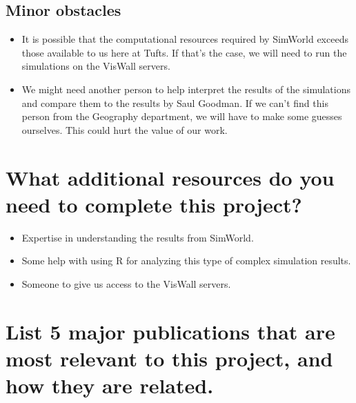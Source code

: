 \documentclass{proc}
\begin{document}
\subsection{Minor obstacles}

\begin{itemize}
  \item It is possible that the computational resources required by SimWorld exceeds those available to us here at Tufts.  If that's the case, we will need to run the simulations on the VisWall servers.
  \item We might need another person to help interpret the results of the simulations and compare them to the results by Saul Goodman. If we can't find this person from the Geography department, we will have to make some guesses ourselves. This could hurt the value of our work.
\end{itemize}

\section{What additional resources do you need to complete this project?}

\begin{itemize}
  \item Expertise in understanding the results from SimWorld.
  \item Some help with using R for analyzing this type of complex simulation results.
  \item Someone to give us access to the VisWall servers.
 \end{itemize}

\section{List 5 major publications that are most relevant to this project, and how they are related.}
\end{document}
